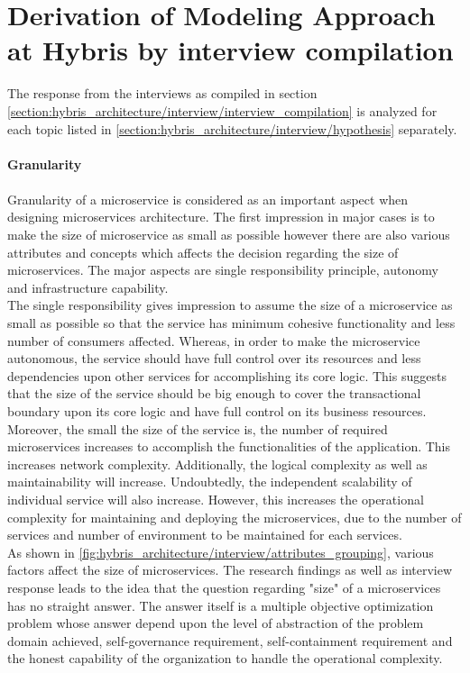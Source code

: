  \section{Derivation of Modeling Approach at Hybris by interview compilation}\label{section:hybris_architecture/interview_summary}
 The response from the interviews as compiled in section \ref{section:hybris_architecture/interview/interview_compilation} is analyzed for each topic listed in \ref{section:hybris_architecture/interview/hypothesis} separately.
 \\
 \\
 \textbf{Granularity}
 \\
 \\
Granularity of a microservice is considered as an important aspect when designing microservices architecture. The first impression in major cases is to make the size of microservice as small as possible however there are also various attributes and concepts which affects the decision regarding the size of microservices. The major aspects are single responsibility principle, autonomy and infrastructure capability.
\\
The single responsibility gives impression to assume the size of a microservice as small as possible so that the service has minimum cohesive functionality and less number of consumers affected. Whereas, in order to make the microservice autonomous, the service should have full control over its resources and less dependencies upon other services for accomplishing its core logic. This suggests that the size of the service should be big enough to cover the transactional boundary upon its core logic and have full control on its business resources. 
\\
Moreover, the small the size of the service is, the number of required microservices increases to accomplish the functionalities of the application. This increases network complexity. Additionally, the logical complexity as well as maintainability will increase. Undoubtedly, the independent scalability of individual service will also increase. However, this increases the operational complexity for maintaining and deploying the microservices, due to the number of services and number of environment to be maintained for each services.
\\
As shown in \ref{fig:hybris_architecture/interview/attributes_grouping}, various factors affect the size of microservices.
The research findings as well as interview response leads to the idea that the question regarding "size" of a microservices has no straight answer. The answer itself is a multiple objective optimization problem whose answer depend upon the level of abstraction of the problem domain achieved, self-governance requirement, self-containment requirement and the honest capability of the organization to handle the operational complexity.
